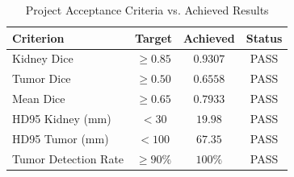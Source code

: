 
\begin{table}[!t]
\caption{Project Acceptance Criteria vs. Achieved Results}
\label{tab:acceptance_criteria}
\centering
\begin{tabular}{@{}lccc@{}}
\toprule
\textbf{Criterion} & \textbf{Target} & \textbf{Achieved} & \textbf{Status} \\
\midrule
Kidney Dice & $\geq 0.85$ & $0.9307$ & PASS \\
Tumor Dice & $\geq 0.50$ & $0.6558$ & PASS \\
Mean Dice & $\geq 0.65$ & $0.7933$ & PASS \\
HD95 Kidney (mm) & $< 30$ & $19.98$ & PASS \\
HD95 Tumor (mm) & $< 100$ & $67.35$ & PASS \\
Tumor Detection Rate & $\geq 90\%$ & $100\%$ & PASS \\
\bottomrule
\end{tabular}
\end{table}
